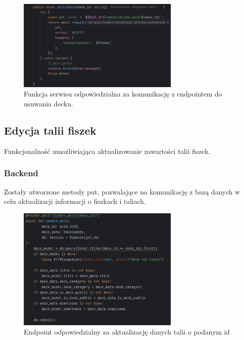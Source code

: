 \begin{figure}[H]
    \centering
    \includegraphics[width=0.7\textwidth]{chapters/chapter_8/screens/delete_deck_web}
    \caption{Funkcja serwisu odpowiedzialna za komunikację z endpointem do usuwania decku.}
    \label{img:delete_deck_web}
\end{figure}

\subsection{Edycja talii fiszek}

Funkcjonalność umożliwiająca aktualizowanie zawartości talii fiszek.

\subsubsection{Backend}

Zostały utworzone metody put, pozwalające na komunikację z bazą danych w celu aktualizacji informacji o fiszkach i taliach.

\begin{figure}[H]
    \centering
    \includegraphics[width=0.7\textwidth]{chapters/chapter_8/screens/update_deck_backend}
    \caption{Endpoint odpowiedzialny za aktualizację danych talii o podanym id}
    \label{img:update_deck_backend}
\end{figure}

